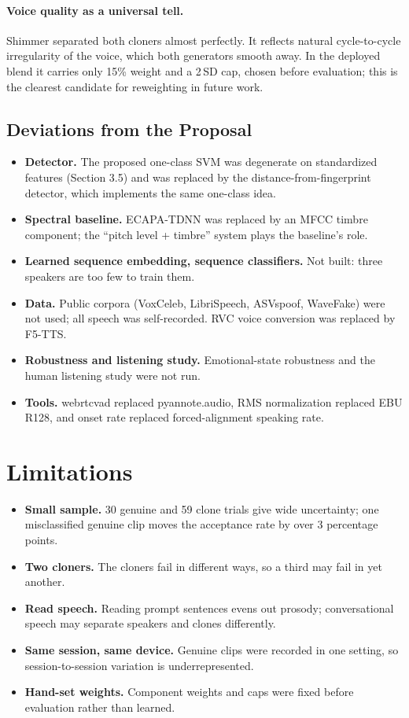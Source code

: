 \documentclass[11pt,a4paper]{article}
\begin{document}
\paragraph{Voice quality as a universal tell.} Shimmer separated both cloners almost perfectly. It reflects natural cycle-to-cycle irregularity of the voice, which both generators smooth away. In the deployed blend it carries only 15\% weight and a 2\,SD cap, chosen before evaluation; this is the clearest candidate for reweighting in future work.

\subsection{Deviations from the Proposal}
\label{sec:deviations}
\begin{itemize}
\item \textbf{Detector.} The proposed one-class SVM was degenerate on standardized features (Section 3.5) and was replaced by the distance-from-fingerprint detector, which implements the same one-class idea.
\item \textbf{Spectral baseline.} ECAPA-TDNN was replaced by an MFCC timbre component; the ``pitch level + timbre'' system plays the baseline's role.
\item \textbf{Learned sequence embedding, sequence classifiers.} Not built: three speakers are too few to train them.
\item \textbf{Data.} Public corpora (VoxCeleb, LibriSpeech, ASVspoof, WaveFake) were not used; all speech was self-recorded. RVC voice conversion was replaced by F5-TTS.
\item \textbf{Robustness and listening study.} Emotional-state robustness and the human listening study were not run.
\item \textbf{Tools.} webrtcvad replaced pyannote.audio, RMS normalization replaced EBU R128, and onset rate replaced forced-alignment speaking rate.
\end{itemize}

\section{Limitations}
\begin{itemize}
\item \textbf{Small sample.} 30 genuine and 59 clone trials give wide uncertainty; one misclassified genuine clip moves the acceptance rate by over 3 percentage points.
\item \textbf{Two cloners.} The cloners fail in different ways, so a third may fail in yet another.
\item \textbf{Read speech.} Reading prompt sentences evens out prosody; conversational speech may separate speakers and clones differently.
\item \textbf{Same session, same device.} Genuine clips were recorded in one setting, so session-to-session variation is underrepresented.
\item \textbf{Hand-set weights.} Component weights and caps were fixed before evaluation rather than learned.
\end{itemize}
\end{document}
